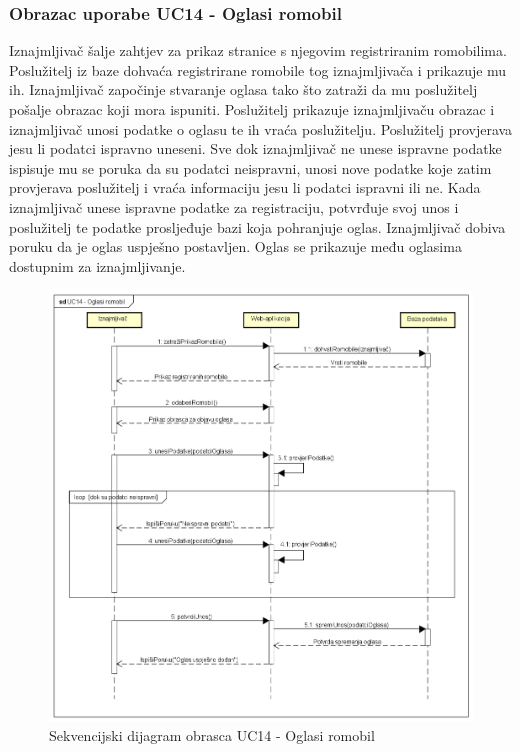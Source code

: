 				\eject

				\subsubsection{Obrazac uporabe UC14 - Oglasi romobil}
						Iznajmljivač šalje zahtjev za prikaz stranice s njegovim registriranim romobilima. Poslužitelj iz baze dohvaća registrirane romobile tog iznajmljivača i prikazuje mu ih. Iznajmljivač započinje stvaranje oglasa tako što zatraži da mu poslužitelj pošalje obrazac koji mora ispuniti. Poslužitelj prikazuje iznajmljivaču obrazac i iznajmljivač unosi podatke o oglasu te ih vraća poslužitelju. Poslužitelj provjerava jesu li podatci ispravno uneseni. Sve dok iznajmljivač ne unese ispravne podatke ispisuje mu se poruka da su podatci neispravni, unosi nove podatke koje zatim provjerava poslužitelj i vraća informaciju jesu li podatci ispravni ili ne. Kada iznajmljivač unese ispravne podatke za registraciju, potvrđuje svoj unos i poslužitelj te podatke prosljeđuje bazi koja pohranjuje oglas. Iznajmljivač dobiva poruku da je oglas uspješno postavljen. Oglas se prikazuje među oglasima dostupnim za iznajmljivanje.
						
						\begin{figure} [H]
							
							\includegraphics[width=1\linewidth]{dijagrami/UC14 - Oglasi romobil.png}
							\centering
							\caption{Sekvencijski dijagram obrasca UC14 - Oglasi romobil}
							\label{fig:Sekvencijski dijagram obrasca UC14 - Oglasi romobil}
						\end{figure}
						
